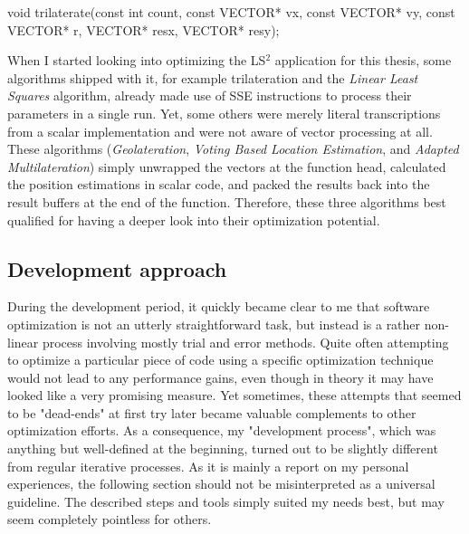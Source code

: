 \begin{code}[caption={Prototype of the \texttt{trilaterate} function},label=prototype]
void trilaterate(const int count, const VECTOR* vx, 
                 const VECTOR* vy, const VECTOR* r, 
                 VECTOR* resx, VECTOR* resy);
\end{code}

When I started looking into optimizing the LS$^{2}$ application for this thesis, some algorithms shipped with it, for example trilateration and the \emph{Linear Least Squares} algorithm, already made use of SSE instructions to process their parameters in a single run. Yet, some others were merely literal transcriptions from a scalar implementation and were not aware of vector processing at all. These algorithms (\emph{Geolateration}, \emph{Voting Based Location Estimation}, and \emph{Adapted Multilateration}) simply unwrapped the vectors at the function head, calculated the position estimations in scalar code, and packed the results back into the result buffers at the end of the function. Therefore, these three algorithms best qualified for having a deeper look into their optimization potential.

\subsection{Development approach}
During the development period, it quickly became clear to me that software optimization is not an utterly straightforward task, but instead is a rather non-linear process involving mostly trial and error methods. Quite often attempting to optimize a particular piece of code using a specific optimization technique would not lead to any performance gains, even though in theory it may have looked like a very promising measure. Yet sometimes, these attempts that seemed to be "dead-ends" at first try later became valuable complements to other optimization efforts. As a consequence, my "development process", which was anything but well-defined at the beginning, turned out to be slightly different from regular iterative processes. As it is mainly a report on my personal experiences, the following section should not be misinterpreted as a universal guideline. The described steps and tools simply suited my needs best, but may seem completely pointless for others.

